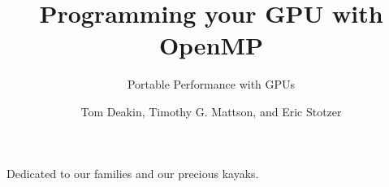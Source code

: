%
\title{Programming your GPU with OpenMP}
\subtitle{Portable Performance with GPUs}
\author{Tom Deakin, Timothy G. Mattson, and Eric Stotzer}
\booktitlepage
 


 
 
\printtitlepage
 
 

 
 
\newpage
\thispagestyle{empty}
\begin{center}
Dedicated to our families and our precious kayaks.
\end{center}
 
 
\newpage
\thispagestyle{empty}
\mbox{ }
\newpage
 

\tableofcontents
 
 
 
 
 

